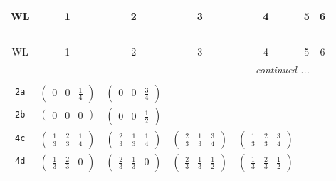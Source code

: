 \documentclass[fleqn,9pt,landscape]{jsarticle}
\begin{document}
\begin{center}
\renewcommand{\arraystretch}{1.2}
\begin{longtable}{ccccccc}
 \hline \hline
WL & 1 & 2 & 3 & 4 & 5 & 6 \\ \hline \endfirsthead

\multicolumn{6}{l}{\tablename\ \thetable{}} \\
 \hline \hline
WL & 1 & 2 & 3 & 4 & 5 & 6 \\ \hline \endhead

 \hline \hline
\multicolumn{6}{r}{\footnotesize\it continued ...} \\ \endfoot

 \hline \hline
\multicolumn{6}{r}{} \\ \endlastfoot

{\tt 2a} & $ \begin{pmatrix} 0 & 0 & \frac{1}{4} \end{pmatrix} $ & $ \begin{pmatrix} 0 & 0 & \frac{3}{4} \end{pmatrix} $ & $  $ & $  $ & $  $ & $  $ \\ \hline
{\tt 2b} & $ \begin{pmatrix} 0 & 0 & 0 \end{pmatrix} $ & $ \begin{pmatrix} 0 & 0 & \frac{1}{2} \end{pmatrix} $ & $  $ & $  $ & $  $ & $  $ \\ \hline
{\tt 4c} & $ \begin{pmatrix} \frac{1}{3} & \frac{2}{3} & \frac{1}{4} \end{pmatrix} $ & $ \begin{pmatrix} \frac{2}{3} & \frac{1}{3} & \frac{1}{4} \end{pmatrix} $ & $ \begin{pmatrix} \frac{2}{3} & \frac{1}{3} & \frac{3}{4} \end{pmatrix} $ & $ \begin{pmatrix} \frac{1}{3} & \frac{2}{3} & \frac{3}{4} \end{pmatrix} $ & $  $ & $  $ \\ \hline
{\tt 4d} & $ \begin{pmatrix} \frac{1}{3} & \frac{2}{3} & 0 \end{pmatrix} $ & $ \begin{pmatrix} \frac{2}{3} & \frac{1}{3} & 0 \end{pmatrix} $ & $ \begin{pmatrix} \frac{2}{3} & \frac{1}{3} & \frac{1}{2} \end{pmatrix} $ & $ \begin{pmatrix} \frac{1}{3} & \frac{2}{3} & \frac{1}{2} \end{pmatrix} $ & $  $ & $  $ \\ \hline

\end{longtable}
\end{center}
\end{document}
